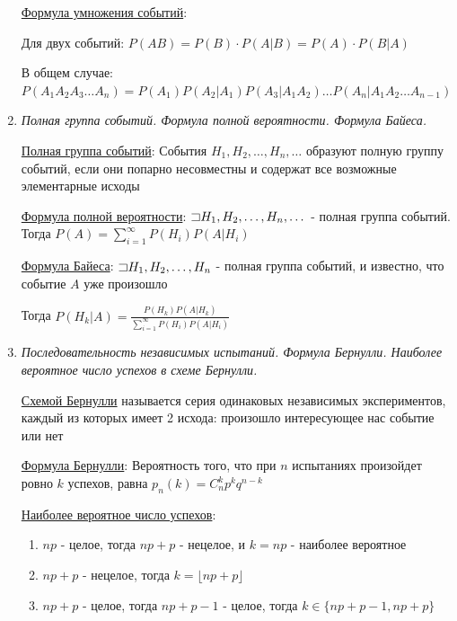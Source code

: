 \documentclass[12pt]{article}
\begin{document}
\begin{enumerate}
    \hyperlink{eventsmultiplicationformula}{Формула умножения событий}:

    Для двух событий: $P(AB) = P(B) \cdot P(A|B) = P(A) \cdot P(B|A)$

    В общем случае: $P(A_1 A_2 A_3 \dots A_n) = P(A_1) P(A_2 | A_1) P(A_3 | A_1 A_2) \dots P(A_n | A_1 A_2 \dots A_{n - 1})$

    \item \textit{Полная группа событий. Формула полной вероятности. Формула Байеса.}

    \hyperlink{completegroupofevents}{Полная группа событий}: События $H_1, H_2, \dots, H_n, \dots$ образуют полную группу событий, если они попарно несовместны и содержат все возможные элементарные исходы

    \hyperlink{formulaofcompleteprobability}{Формула полной вероятности}: $\mathord{\sqsupset} H_1, H_2, \dots, H_n, \dots$ - полная группа событий. Тогда $P(A) = \sum_{i = 1}^\infty P(H_i) P(A | H_i)$
    
    \hyperlink{bayesformula}{Формула Байеса}: $\mathord{\sqsupset} H_1, H_2, \dots, H_n$ - полная группа событий, и известно, что событие $A$ уже произошло

    Тогда $P(H_k | A) = \frac{P(H_k) P(A | H_k)}{\sum_{i = 1}^\infty P(H_i) P(A | H_i)}$

    \item \textit{Последовательность независимых испытаний. Формула Бернулли. Наиболее вероятное число успехов в схеме Бернулли.}

    \hyperlink{bernoullischema}{Схемой Бернулли} называется серия одинаковых независимых экспериментов, каждый из которых имеет 2 исхода: произошло интересующее нас событие или нет

    \hyperlink{bernoulliformula}{Формула Бернулли}: Вероятность того, что при $n$ испытаниях произойдет ровно $k$ успехов, равна
    $p_n(k) = C_n^k p^k q^{n - k}$

    \hyperlink{themostprobablenumberofsuccesses}{Наиболее вероятное число успехов}: 

    \begin{enumerate}
        \item $np$ - целое, тогда $np + p$ - нецелое, и $k = np$ - наиболее вероятное

        \item $np + p$ - нецелое, тогда $k = \lfloor np + p \rfloor$

        \item $np + p$ - целое, тогда $np + p - 1$ - целое, тогда $k \in \{np + p - 1, np + p\}$
    \end{enumerate}


\end{enumerate}
\end{document}
